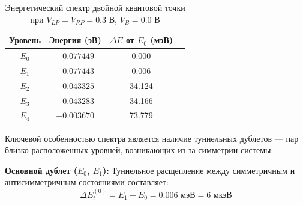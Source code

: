 \documentclass[a4paper,14pt]{extreport} %
\begin{document}



\begin{table}[h]
\centering
\caption{Энергетический спектр двойной квантовой точки при $V_{LP} = V_{RP} = 0.3$ В, $V_B = 0.0$ В}
\label{tab:2qd_spectrum}
\begin{tabular}{cccc}
\toprule
Уровень & Энергия (эВ) & $\Delta E$ от $E_0$ (мэВ) \\
\midrule
$E_0$ & $-0.077449$ & 0.000  \\
$E_1$ & $-0.077443$ & 0.006  \\
$E_2$ & $-0.043325$ & 34.124 \\
$E_3$ & $-0.043283$ & 34.166 \\
$E_4$ & $-0.003670$ & 73.779 \\
\bottomrule
\end{tabular}
\end{table}

Ключевой особенностью спектра является наличие туннельных дублетов — пар близко расположенных уровней, возникающих из-за симметрии системы:

\textbf{Основной дублет ($E_0$, $E_1$):}
Туннельное расщепление между симметричным и антисимметричным состояниями составляет:
\begin{equation}
    \Delta E_t^{(0)} = E_1 - E_0 = 0.006 \text{ мэВ} = 6 \text{ мкэВ}
\end{equation}


\end{document}
